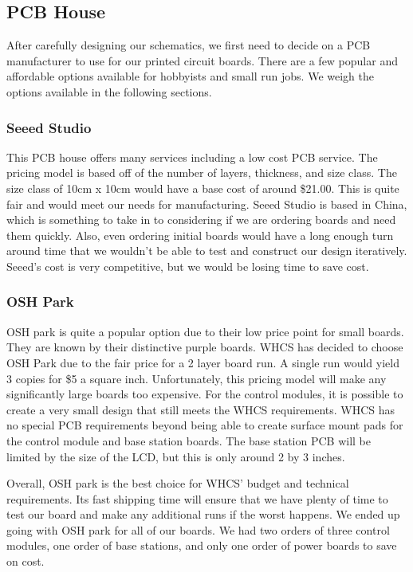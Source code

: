 \subsection{PCB House}
After carefully designing our schematics, we first need to decide on a PCB
manufacturer to use for our printed circuit boards. There are a few popular and
affordable options available for hobbyists and small run jobs. We weigh the
options available in the following sections.

\subsubsection{Seeed Studio}
This PCB house offers many services including a low cost PCB service. The
pricing model is based off of the number of layers, thickness, and size class.
The size class of 10cm x 10cm would have a base cost of around \$21.00. This is
quite fair and would meet our needs for manufacturing.  Seeed Studio is based
in China, which is something to take in to considering if we are ordering
boards and need them quickly. Also, even ordering initial boards would have a
long enough turn around time that we wouldn't be able to test and construct our
design iteratively. Seeed's cost is very competitive, but we would be losing
time to save cost.

\subsubsection{OSH Park}
OSH park is quite a popular option due to their low price point for small
boards. They are known by their distinctive purple boards. WHCS has decided to
choose OSH Park due to the fair price for a 2 layer board run. A single
run would yield 3 copies for \$5 a square inch. Unfortunately, this pricing
model will make any significantly large boards too expensive. For the control
modules, it is possible to create a very small design that still meets the WHCS
requirements.  WHCS has no special PCB requirements beyond being able to create
surface mount pads for the control module and base station boards.  The base
station PCB will be limited by the size of the LCD, but this is only around 2
by 3 inches.

Overall, OSH park is the best choice for WHCS' budget and technical
requirements. Its fast shipping time will ensure that we have plenty of time to test our board and make any additional runs if the worst happens. We ended up going with OSH park for all of our boards. We had two orders of three control modules, one order of base stations, and only one order of power boards to save on cost.

